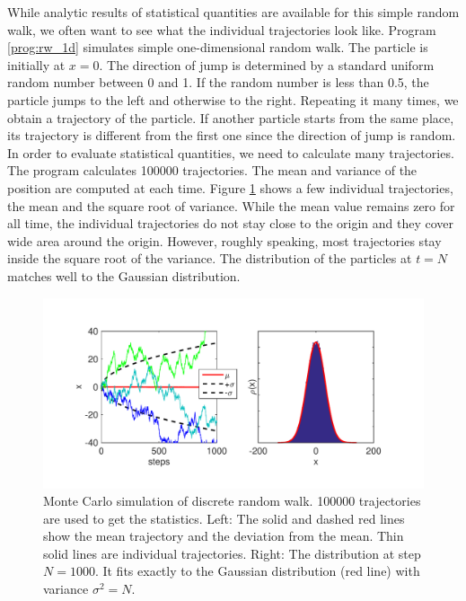 \bigskip
\begin{example}

While analytic results of statistical quantities are available for this simple random walk, we often want to see what the individual trajectories look like. Program \ref{prog:rw_1d} simulates simple one-dimensional random walk. The particle is initially at $x=0$. The direction of jump is determined by a standard uniform random number between 0 and 1.  If the random number is less than 0.5, the particle jumps to the left and otherwise to the right.  Repeating it many times, we obtain a trajectory of the particle.  If another particle starts from the same place, its trajectory is different from the first one since the direction of jump is random. In order to evaluate statistical quantities, we need to calculate many trajectories. The program calculates 100000 trajectories.  The mean and variance of the position are computed at each time.  Figure \ref{fig:rw_1d} shows a few individual trajectories, the mean and the square root of variance.  While the mean value remains zero for all time, the individual trajectories do not stay close to the origin and they cover wide area around the origin.  However, roughly speaking,  most trajectories stay inside the square root of the variance.  The distribution of the particles at $t=N$ matches well to the Gaussian distribution.

\begin{figure}
\centering
\includegraphics[width=5.0in]{16.Random-Walk/rw_1d.pdf}
\caption{Monte Carlo simulation of discrete random walk.   100000 trajectories are used to get the statistics. Left: The solid and dashed red lines show the mean trajectory and the deviation from the mean. Thin solid lines are individual trajectories.  Right: The distribution at step $N=1000$.  It fits exactly to the Gaussian distribution (red line) with variance $\sigma^2=N$.}
\label{fig:rw_1d}
\end{figure}

\end{example}

